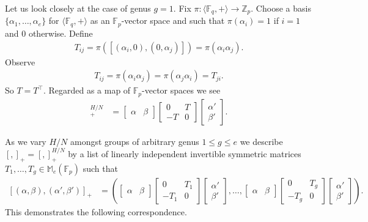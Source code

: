 \documentclass[11pt]{article}
\numberwithin{equation}{section}
\theoremstyle{definition}
\theoremstyle{plain}
\numberwithin{equation}{section}
\theoremstyle{plain}       %
\theoremstyle{remark}
\theoremstyle{definition}
\numberwithin{figure}{section}
\numberwithin{table}{section}
\newcommand{\bbF}{\mathbb{F}}  %
\begin{document}
Let us look closely at the case of genus $g=1$.  Fix
$\pi:\langle\bbF_q,+\rangle\to \mathbb{Z}_p$.  Choose a basis
$\{\alpha_1,\dots,\alpha_e\}$ for $\langle \bbF_q,+\rangle$ as an
$\bbF_p$-vector space and such that $\pi(\alpha_i)=1$ if $i=1$ and $0$
otherwise.  Define 
\begin{align*}
	T_{ij}=\pi([(\alpha_i,0),(0,\alpha_j)]) = \pi(\alpha_i \alpha_j).
\end{align*}
Observe 
\begin{align}\label{eq:T-sym}
	T_{ij}=\pi(\alpha_i\alpha_j) =\pi(\alpha_j\alpha_i)=T_{ji}.
\end{align}
So $T=T^{\top}$.  Regarded as a map of $\bbF_p$-vector spaces we see
\begin{align*}
	[(\alpha,\beta),(\alpha',\beta')]_+^{H/N} & = 
		\begin{bmatrix} \alpha & \beta\end{bmatrix}
		\begin{bmatrix} 0 & T\\ -T & 0 \end{bmatrix}
		\begin{bmatrix} \alpha'\\ \beta'\end{bmatrix}.
\end{align*}

As we vary $H/N$ amongst groups of arbitrary genus $1\leq g\leq e$ we describe
$[,]_+=[,]_+^{H/N}$ by a list of linearly independent invertible symmetric
matrices $T_1,\dots,T_g\in \mathbb{M}_e(\bbF_p)$ such that
\begin{align}\label{def:gettable}
	[(\alpha,\beta),(\alpha',\beta')]_+ & = 
		\left(
		\begin{bmatrix} \alpha &\beta \end{bmatrix}\!
		\begin{bmatrix} 0 & T_1\\ -T_1 & 0 \end{bmatrix}\!
		\begin{bmatrix}\alpha'\\ \beta'\end{bmatrix},
		\dots,
		\begin{bmatrix} \alpha &\beta \end{bmatrix}\!
		\begin{bmatrix} 0 & T_g\\ -T_g & 0 \end{bmatrix}\!
		\begin{bmatrix}\alpha'\\  \beta'\end{bmatrix}\right).
\end{align}
This demonstrates the following correspondence.
\end{document}
